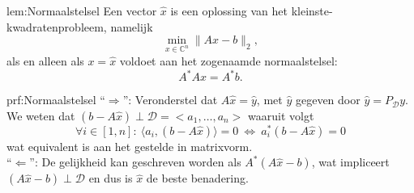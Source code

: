 \begin{lem}[Normaalstelsel]{lem:Normaalstelsel}
    \vspace{-0.1cm}
    Een vector $\hat{x}$ is een oplossing van het kleinste-kwadratenprobleem, namelijk
    \begin{equation*}
        \min_{x \in \mathbb{C}^n} \|Ax-b\|_2,
    \end{equation*}
    als en alleen als $x = \hat{x}$ voldoet aan het zogenaamde normaalstelsel:
    \begin{equation*}
        A^*Ax = A^*b.
    \end{equation*}
    \vspace{-0.7cm}
\end{lem}

\begin{prf}[Normaalstelsel]{prf:Normaalstelsel}
    ``$\Rightarrow$'': Veronderstel dat $A\hat{x} = \hat{y}$, met $\hat{y}$ gegeven door $\hat{y} = P_{\mathcal{D}}y$. We weten dat $(b-A\hat{x}) \perp \mathcal{D} = <a_1,\ldots,a_n>$ waaruit volgt
    \begin{equation*}
        \forall i \in [1,n]: \ \langle a_i, (b-A\hat{x}) \rangle = 0 \ \Leftrightarrow \ a_i^*(b-A\hat{x}) = 0 
    \end{equation*}
    wat equivalent is aan het gestelde in matrixvorm. \\

    ``$\Leftarrow$'': De gelijkheid kan geschreven worden als $A^*(A\hat{x}-b)$, wat impliceert $(A\hat{x}-b) \perp \mathcal{D}$ en dus is $\hat{x}$ de beste benadering.
\end{prf}